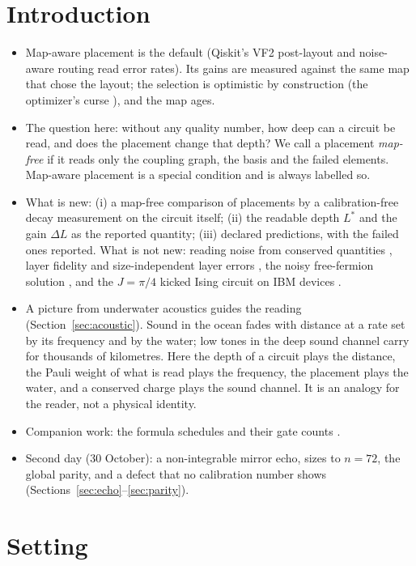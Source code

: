 \documentclass[11pt]{article}
\begin{document}
\section{Introduction}

\begin{itemize}
\item Map-aware placement is the default (Qiskit's VF2 post-layout and noise-aware routing read error rates). Its
  gains are measured against the same map that chose the layout; the selection is optimistic by construction (the
  optimizer's curse \cite{smith2006}), and the map ages.
\item The question here: without any quality number, how deep can a circuit be read, and does the placement change
  that depth? We call a placement \emph{map-free} if it reads only the coupling graph, the basis and the failed
  elements. Map-aware placement is a special condition and is always labelled so.
\item What is new: (i) a map-free comparison of placements by a calibration-free decay measurement on the circuit
  itself; (ii) the readable depth $L^*$ and the gain $\Delta L$ as the reported quantity; (iii) declared predictions,
  with the failed ones reported. What is not new: reading noise from conserved quantities
  \cite{maruyoshi2023,oliva2026}, layer fidelity and size-independent layer errors \cite{mckay2023}, the noisy
  free-fermion solution \cite{pocklington2026}, and the $J=\pi/4$ kicked Ising circuit on IBM devices \cite{fischer2024}.
\item A picture from underwater acoustics guides the reading (Section~\ref{sec:acoustic}). Sound in the ocean fades
  with distance at a rate set by its frequency and by the water; low tones in the deep sound channel carry for
  thousands of kilometres. Here the depth of a circuit plays the distance, the Pauli weight of what is read plays the
  frequency, the placement plays the water, and a conserved charge plays the sound channel. It is an analogy for the
  reader, not a physical identity.
\item Companion work: the formula schedules and their gate counts \cite{paper4}.
\item Second day (30 October): a non-integrable mirror echo, sizes to $n=72$, the global parity, and a defect that
  no calibration number shows (Sections~\ref{sec:echo}--\ref{sec:parity}).
\end{itemize}

\section{Setting}
\end{document}
